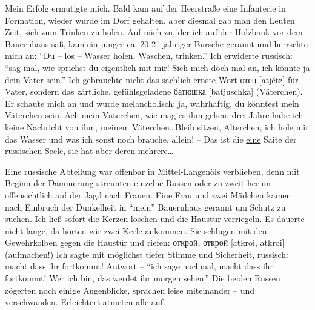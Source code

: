 \documentclass[a5paper,pagesize,10pt,twoside=true]{scrbook}
\newcommand\textcyr[1]{{\fontencoding{OT2}\fontfamily{wncyr}\selectfont #1}}	%
\renewcommand{\marginpar}[2][]{}
\begin{document}
Mein Erfolg ermutigte mich. Bald kam auf der Heerstraße eine Infanterie in Formation, wieder wurde im Dorf gehalten, aber diesmal gab man den Leuten Zeit, sich zum Trinken zu holen. Auf mich zu, der ich auf der Holzbank vor dem Bauernhaus saß, kam ein junger ca. 20-21 jähriger Bursche gerannt und herrschte mich an: \enquote{Du -- los -- Wasser holen, Waschen, trinken.} Ich erwiderte russisch: \enquote{sag mal, wie sprichst du eigentlich mit mir! Sieh mich doch mal an, ich könnte ja dein Vater sein.} Ich gebrauchte nicht das sachlich-ernste Wort \textcyr{отец} [atjétz] für Vater, sondern das zärtliche, gefühlsgeladene \textcyr{батюшка} [batjuschka] (Väterchen). Er schaute mich an und wurde melancholisch: ja, wahrhaftig, du könntest mein Väterchen sein. Ach mein Väterchen, wie mag es ihm gehen, drei Jahre habe ich keine Nachricht von ihm, meinem Väterchen\dots Bleib \marginpar{74} sitzen, Alterchen, ich hole mir das Wasser und was ich sonst noch brauche, allein! -- Das ist die \underline{eine} Saite der russischen Seele, sie hat aber deren mehrere\dots

Eine russische Abteilung war offenbar in Mittel-Langenöls verblieben, denn mit Beginn der Dämmerung streunten einzelne Russen oder zu zweit herum offensichtlich auf der Jagd nach Frauen. Eine Frau und zwei Mädchen kamen nach Einbruch der Dunkelheit in \enquote{mein} Bauernhaus gerannt um Schutz zu suchen. Ich ließ sofort die Kerzen löschen und die Haustür verriegeln. Es dauerte nicht lange, da hörten wir zwei Kerle ankommen. Sie schlugen mit den Gewehrkolben gegen die Haustür und riefen: \textcyr{открой, открой} [atkroi, atkroi] (aufmachen!) Ich sagte mit möglichst tiefer Stimme und Sicherheit, russisch: macht dass ihr fortkommt! Antwort -- \enquote{ich sage nochmal, macht dass ihr fortkommt! Wer ich bin, das werdet ihr morgen sehen.} Die beiden Russen zögerten noch einige Augenblicke, sprachen leise miteinander -- und verschwanden. Erleichtert atmeten alle auf.
\end{document}
